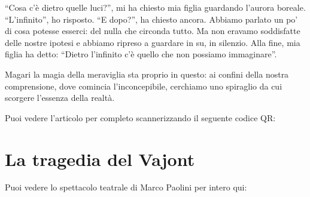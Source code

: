 \documentclass[11pt]{report}
\begin{document}
“Cosa c’è dietro quelle luci?”, mi ha chiesto mia figlia guardando l’aurora boreale. “L’infinito”, ho risposto. “E dopo?”, ha chiesto ancora. Abbiamo parlato un po’ di cosa potesse esserci: del nulla che circonda tutto. Ma non eravamo soddisfatte delle nostre ipotesi e abbiamo ripreso a guardare in su, in silenzio. Alla fine, mia figlia ha detto: “Dietro l’infinito c’è quello che non possiamo immaginare”.

Magari la magia della meraviglia sta proprio in questo: ai confini della nostra comprensione, dove comincia l’inconcepibile, cerchiamo uno spiraglio da cui scorgere l’essenza della realtà.

\hrulefill

Puoi vedere l'articolo per completo scannerizzando il seguente codice QR:

\begin{center}
\end{center}


\section*{La tragedia del Vajont}
Puoi vedere lo spettacolo teatrale di Marco Paolini per intero qui:

\begin{center}
\end{center}
\end{document}
